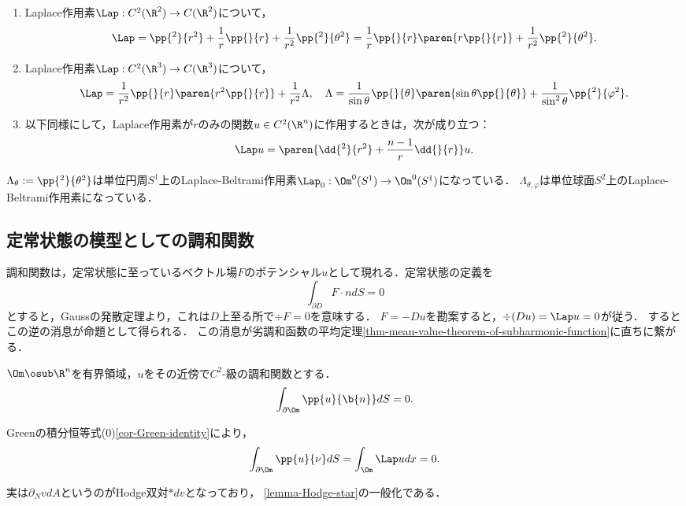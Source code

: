 \documentclass[uplatex,dvipdfmx]{jsreport}
\begin{document}
\begin{theorem}[Laplacianの極座標表示]\mbox{}\label{thm-Laplacian-in-polar-coordinate}
    \begin{enumerate}
        \item Laplace作用素$\Lap:C^2(\R^2)\to C(\R^2)$について，
        \[\Lap=\pp{^2}{r^2}+\frac{1}{r}\pp{}{r}+\frac{1}{r^2}\pp{^2}{\theta^2}=\frac{1}{r}\pp{}{r}\paren{r\pp{}{r}}+\frac{1}{r^2}\pp{^2}{\theta^2}.\]
        \item Laplace作用素$\Lap:C^2(\R^3)\to C(\R^3)$について，
        \[\Lap=\frac{1}{r^2}\pp{}{r}\paren{r^2\pp{}{r}}+\frac{1}{r^2}\Lambda,\quad\Lambda=\frac{1}{\sin\theta}\pp{}{\theta}\paren{\sin\theta\pp{}{\theta}}+\frac{1}{\sin^2\theta}\pp{^2}{\varphi^2}.\]
        \item 以下同様にして，Laplace作用素が$r$のみの関数$u\in C^2(\R^n)$に作用するときは，次が成り立つ：
        \[\Lap u=\paren{\dd{^2}{r^2}+\frac{n-1}{r}\dd{}{r}}u.\]
    \end{enumerate}
\end{theorem}
\begin{remarks}
    $\Lambda_\theta:=\pp{^2}{\theta^2}$は単位円周$S^1$上のLaplace-Beltrami作用素$\Lap_0:\Om^0(S^1)\to\Om^0(S^1)$になっている．
    $\Lambda_{\theta,\varphi}$は単位球面$S^2$上のLaplace-Beltrami作用素になっている．
\end{remarks}

\subsection{定常状態の模型としての調和関数}

\begin{tcolorbox}[colframe=ForestGreen, colback=ForestGreen!10!white,breakable,colbacktitle=ForestGreen!40!white,coltitle=black,fonttitle=\bfseries\sffamily,
title=]
    調和関数は，定常状態に至っているベクトル場$F$のポテンシャル$u$として現れる．定常状態の定義を
    \[\int_{\partial D}F\cdot ndS=0\]
    とすると，Gaussの発散定理より，これは$D$上至る所で$\div F=0$を意味する．
    $F=-Du$を勘案すると，$\div(Du)=\Lap u=0$が従う．
    するとこの逆の消息が命題として得られる．
    この消息が劣調和函数の平均定理\ref{thm-mean-value-theorem-of-subharmonic-function}に直ちに繋がる．
\end{tcolorbox}

\begin{proposition}
    $\Om\osub\R^n$を有界領域，$u$をその近傍で$C^2$-級の調和関数とする．
    \[\int_{\partial\Om}\pp{u}{\b{n}}dS=0.\]
\end{proposition}
\begin{Proof}
    Greenの積分恒等式(0)\ref{cor-Green-identity}により，
    \[\int_{\partial\Om}\pp{u}{\nu}dS=\int_\Om\Lap udx=0.\]
\end{Proof}
\begin{remarks}
    実は$\partial_NvdA$というのがHodge双対$*dv$となっており，
    \ref{lemma-Hodge-star}の一般化である．
\end{remarks}
\end{document}
